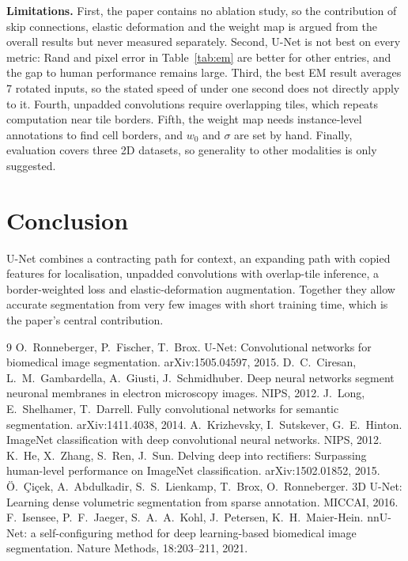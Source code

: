 \documentclass[10pt,twocolumn]{article}
\begin{document}
\textbf{Limitations.} First, the paper contains no ablation study, so the contribution of skip connections, elastic deformation and the weight map is argued from the overall results but never measured separately. Second, U-Net is not best on every metric: Rand and pixel error in Table~\ref{tab:em} are better for other entries, and the gap to human performance remains large. Third, the best EM result averages 7 rotated inputs, so the stated speed of under one second does not directly apply to it. Fourth, unpadded convolutions require overlapping tiles, which repeats computation near tile borders. Fifth, the weight map needs instance-level annotations to find cell borders, and $w_0$ and $\sigma$ are set by hand. Finally, evaluation covers three 2D datasets, so generality to other modalities is only suggested.

\section{Conclusion}
U-Net combines a contracting path for context, an expanding path with copied features for localisation, unpadded convolutions with overlap-tile inference, a border-weighted loss and elastic-deformation augmentation. Together they allow accurate segmentation from very few images with short training time, which is the paper's central contribution.

\begin{thebibliography}{9}\small
\setlength{\itemsep}{0pt}
 O.~Ronneberger, P.~Fischer, T.~Brox. U-Net: Convolutional networks for biomedical image segmentation. arXiv:1505.04597, 2015.
 D.~C.~Ciresan, L.~M.~Gambardella, A.~Giusti, J.~Schmidhuber. Deep neural networks segment neuronal membranes in electron microscopy images. NIPS, 2012.
 J.~Long, E.~Shelhamer, T.~Darrell. Fully convolutional networks for semantic segmentation. arXiv:1411.4038, 2014.
 A.~Krizhevsky, I.~Sutskever, G.~E.~Hinton. ImageNet classification with deep convolutional neural networks. NIPS, 2012.
 K.~He, X.~Zhang, S.~Ren, J.~Sun. Delving deep into rectifiers: Surpassing human-level performance on ImageNet classification. arXiv:1502.01852, 2015.
 \"{O}.~\c{C}i\c{c}ek, A.~Abdulkadir, S.~S.~Lienkamp, T.~Brox, O.~Ronneberger. 3D U-Net: Learning dense volumetric segmentation from sparse annotation. MICCAI, 2016.
 F.~Isensee, P.~F.~Jaeger, S.~A.~A.~Kohl, J.~Petersen, K.~H.~Maier-Hein. nnU-Net: a self-configuring method for deep learning-based biomedical image segmentation. Nature Methods, 18:203--211, 2021.
\end{thebibliography}
\end{document}

